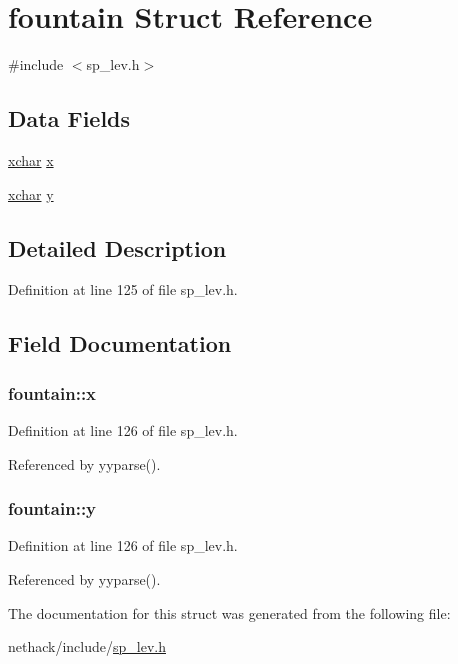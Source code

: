 \hypertarget{structfountain}{\section{fountain Struct Reference}
\label{structfountain}
}


{\ttfamily \#include $<$sp\+\_\+lev.\+h$>$}

\subsection*{Data Fields}
\begin{DoxyCompactItemize}
\item 
\hyperlink{global_8h_a2043b7d01ce89f4ee2fa6c345a752d32}{xchar} \hyperlink{structfountain_a4d961bd1595cc47db7b98de352c664b4}{x}
\item 
\hyperlink{global_8h_a2043b7d01ce89f4ee2fa6c345a752d32}{xchar} \hyperlink{structfountain_ac0c570fba191ef9f1c37908d3ddc07dc}{y}
\end{DoxyCompactItemize}


\subsection{Detailed Description}


Definition at line 125 of file sp\+\_\+lev.\+h.



\subsection{Field Documentation}
\hypertarget{structfountain_a4d961bd1595cc47db7b98de352c664b4}{
\subsubsection[{x}]{ fountain\+::x}}\label{structfountain_a4d961bd1595cc47db7b98de352c664b4}


Definition at line 126 of file sp\+\_\+lev.\+h.



Referenced by yyparse().

\hypertarget{structfountain_ac0c570fba191ef9f1c37908d3ddc07dc}{
\subsubsection[{y}]{ fountain\+::y}}\label{structfountain_ac0c570fba191ef9f1c37908d3ddc07dc}


Definition at line 126 of file sp\+\_\+lev.\+h.



Referenced by yyparse().



The documentation for this struct was generated from the following file\+:\begin{DoxyCompactItemize}
\item 
nethack/include/\hyperlink{sp__lev_8h}{sp\+\_\+lev.\+h}\end{DoxyCompactItemize}
